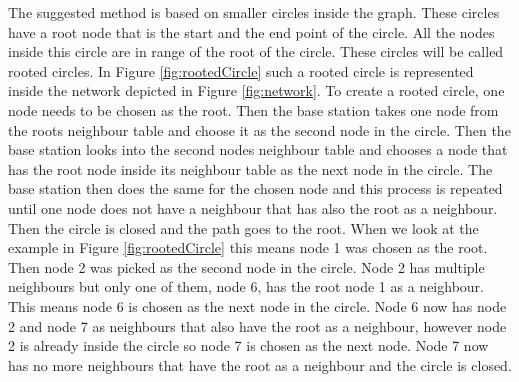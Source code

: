 The suggested method is based on smaller circles inside the graph. These circles have a root node that is the start and the end point of the circle. All the nodes inside this circle are in range of the root of the circle. These circles will be called rooted circles. In Figure \ref{fig:rootedCircle} such a rooted circle is represented inside the network depicted in Figure \ref{fig:network}. To create a rooted circle, one node needs to be chosen as the root. Then the base station takes one node from the roots neighbour table and choose it as the second node in the circle.  Then the base station looks into the second nodes neighbour table and chooses a node that has the root node inside its neighbour table as the next node in the circle. The base station then does the same for the chosen node and this process is repeated until one node does not have a neighbour that has also the root as a neighbour. Then the circle is closed and the path goes to the root. When we look at the example in Figure \ref{fig:rootedCircle} this means node 1 was chosen as the root. Then node 2 was picked as the second node in the circle. Node 2 has multiple neighbours but only one of them, node 6, has the root node 1 as a neighbour. This means node 6 is chosen as the next node in the circle. Node 6 now has node 2 and node 7 as neighbours that also have the root as a neighbour, however node 2 is already inside the circle so node 7 is chosen as the next node. Node 7 now has no more neighbours that have the root as a neighbour and the circle is closed.

